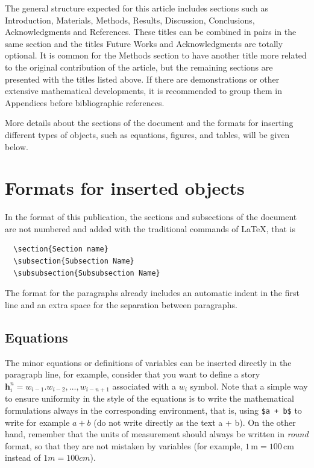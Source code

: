 \documentclass[eng,blind]{ajceam-class}
\newcommand{\vect}[1]{\mathbf{#1}}  %
\begin{document}
The general structure expected for this article includes sections such as Introduction, Materials, Methods, Results, Discussion, Conclusions, Acknowledgments and References. These titles can be combined in pairs in the same section and the titles Future Works and Acknowledgments are totally optional. It is common for the Methods section to have another title more related to the original contribution of the article, but the remaining sections are presented with the titles listed above. If there are demonstrations or other extensive mathematical developments, it is recommended to group them in Appendices before bibliographic references.

More details about the sections of the document and the formats for inserting different types of objects, such as equations, figures, and tables, will be given below.

\section{Formats for inserted objects}

In the format of this publication, the sections and subsections of the document are not numbered and added with the traditional commands of \LaTeX, that is

\begin{verbatim}
  \section{Section name}
  \subsection{Subsection Name}
  \subsubsection{Subsubsection Name}
\end{verbatim}

The format for the paragraphs already includes an automatic indent in the first line and an extra space for the separation between paragraphs.

\subsection{Equations}

The minor equations or definitions of variables can be inserted directly in the paragraph line, for example, consider that you want to define a story $\vect{h}_i^n = w_{i-1}. w_{i-2}, \dots, w_{i-n+1}$ associated with a $w_i$ symbol. Note that a simple way to ensure uniformity in the style of the equations is to write the mathematical formulations always in the corresponding environment, that is, using \verb!$a + b$! to write for example $a + b$ (do not write directly as the text a + b). On the other hand, remember that the units of measurement should always be written in \emph{round} format, so that they are not mistaken by variables (for example, $1\,\text{m} = 100\,\text{cm}$ instead of $1m = 100cm$).
\end{document}
